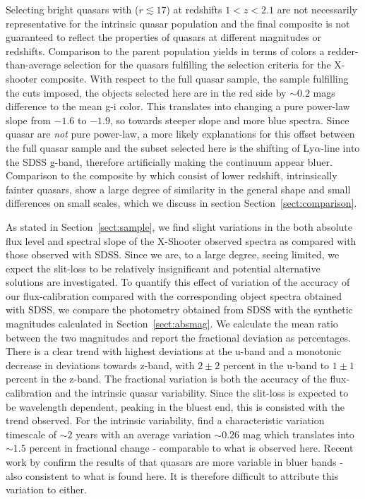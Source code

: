 \documentclass{aa}    %
\newcommand{\sectionname}{Section}
\newcommand{\Sect}[1]{\sectionname~\ref{sect:#1}}
\newcommand{\sect}[1]{\Sect{#1}}
\newcommand{\lya}{Ly$\alpha$}
\begin{document}
Selecting bright quasars with ($r \lesssim 17$) at redshifts $1 < z < 2.1$ are not necessarily representative for the intrinsic quasar population\citep{Paris2014} and the final composite is not guaranteed to reflect the properties of quasars at different magnitudes or redshifts. Comparison to the parent population yields in terms of colors a redder-than-average selection for the quasars fulfilling the selection criteria for the X-shooter composite. With respect to the full quasar sample, the sample fulfilling the cuts imposed, the objects selected here are in the red side by $\sim 0.2$ mags difference to the mean g-i color. This translates into changing a pure power-law slope from $-1.6$ to $-1.9$, so towards steeper slope and more blue spectra. Since quasar are \textit{not} pure power-law, a more likely explanations for this offset between the full quasar sample and the subset selected here is the shifting of \lya-line into the SDSS g-band, therefore artificially making the continuum appear bluer.
Comparison to the composite by \citet{VandenBerk2001} which consist of lower redshift, intrinsically fainter quasars, show a large degree of similarity in the general shape and small differences on small scales, which we discuss in section \sect{comparison}. 

As stated in \sect{sample}, we find slight variations in the both absolute flux level and spectral slope of the X-Shooter observed spectra as compared with those observed with SDSS. Since we are, to a large degree, seeing limited, we expect the slit-loss to be relatively insignificant and potential alternative solutions are investigated. To quantify this effect of variation of the accuracy of our flux-calibration compared with the corresponding object spectra obtained with SDSS, we compare the photometry obtained from SDSS with the synthetic magnitudes calculated in \sect{absmag}. We calculate the mean ratio between the two magnitudes and report the fractional deviation as percentages. There is a clear trend with highest deviations at the u-band and a monotonic decrease in deviations towards z-band, with $2 \pm 2$ percent in the u-band to $1 \pm 1$ percent in the z-band. The fractional variation is both the accuracy of the flux-calibration and the intrinsic quasar variability. Since the slit-loss is expected to be wavelength dependent, peaking in the bluest end, this is consisted with the trend observed. For the intrinsic variability, \cite{MacLeod2012} find a characteristic variation timescale of $\sim 2$ years with an average variation $\sim 0.26$ mag which translates into $\sim 1.5$ percent in fractional change - comparable to what is observed here. Recent work by \cite{Morganson2014} confirm the results of \cite{Helfand2001} that quasars are more variable in bluer bands - also consistent to what is found here. It is therefore difficult to attribute this variation to either. 
\end{document}
